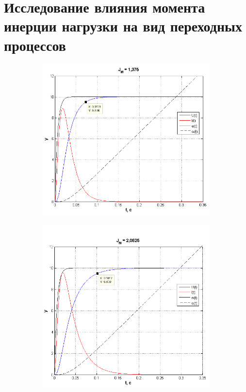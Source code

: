 \documentclass[fleqn, a4paper, 11pt, russian]{article}
\begin{document}
	\section{Исследование влияния момента инерции нагрузки на вид переходных процессов}
	\begin{figure}[ht!]
		\centering
		\begin{subfigure}[b]{0.48\textwidth}
			\includegraphics[width = \textwidth]{J1}
		\end{subfigure}
		\hfill
		\begin{subfigure}[b]{0.48\textwidth}
			\includegraphics[width = \textwidth]{J2}
		\end{subfigure}
	\end{figure}
	
\end{document}
